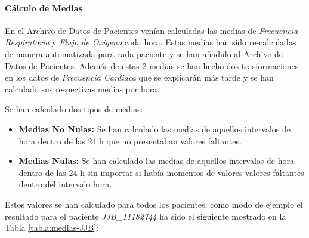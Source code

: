 \paragraph*{Cálculo de Medias}

En el Archivo de Datos de Pacientes venían calculadas las medias de \textit{Frecuencia Respiratoria} y \textit{Flujo de Oxígeno} cada hora. Estas medias han sido re-calculadas de manera automatizada para cada paciente y se han añadido al Archivo de Datos de Pacientes. Además de estas 2 medias se han hecho dos trasformaciones en los datos de \textit{Frecuencia Cardiaca} que se explicarán más tarde y se han calculado sus respectivas medias por hora. 

Se han calculado dos tipos de medias: 

\begin{itemize}
    \item \textbf{Medias No Nulas:} Se han calculado las medias de aquellos intervalos de hora dentro de las 24 h que no presentaban valores faltantes.
    \item \textbf{Medias Nulas:} Se han calculado las medias de aquellos intervalos de hora dentro de las 24 h sin importar si había momentos de valores valores faltantes dentro del intervalo hora.
\end{itemize}

Estos valores se han calculado para todos los pacientes, como modo de ejemplo el resultado para el paciente \textit{JJB\_11182744} ha sido el siguiente mostrado en la Tabla \ref{tabla:medias-JJB}:

\newpage
\thispagestyle{empty}

